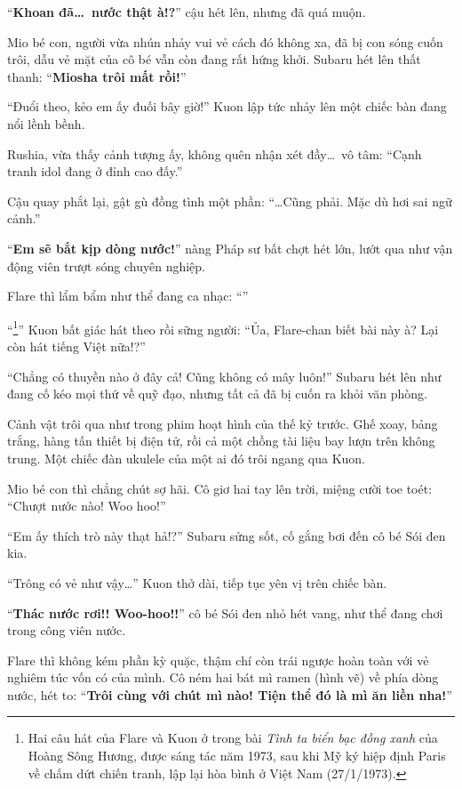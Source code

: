 \documentclass[../main.tex]{subfiles}
\begin{document}

``\textbf{Khoan đã\dots\ nước thật à!?}'' cậu hét lên, nhưng đã quá muộn.

Mio bé con, người vừa nhún nhảy vui vẻ cách đó không xa, đã bị con sóng cuốn trôi, dẫu vẻ mặt của cô bé vẫn còn đang rất hứng khởi. Subaru hét lên thất thanh: ``\textbf{Miosha trôi mất rồi!}''

``Đuổi theo, kẻo em ấy đuối bây giờ!'' Kuon lập tức nhảy lên một chiếc bàn đang nổi lềnh bềnh.

Rushia, vừa thấy cảnh tượng ấy, không quên nhận xét đầy\dots\ vô tâm: ``Cạnh tranh idol đang ở đỉnh cao đấy.''

Cậu quay phắt lại, gật gù đồng tình một phần: ``\dots Cũng phải. Mặc dù hơi sai ngữ cảnh.''

``\textbf{Em sẽ bắt kịp dòng nước!}'' nàng Pháp sư bất chợt hét lớn, lướt qua như vận động viên trượt sóng chuyên nghiệp.

Flare thì lẩm bẩm như thể đang ca nhạc: ``''

``\footnote{Hai câu hát của Flare và Kuon ở trong bài \textit{Tình ta biển bạc đồng xanh} của Hoàng Sông Hương, được sáng tác năm 1973, sau khi Mỹ ký hiệp định Paris về chấm dứt chiến tranh, lập lại hòa bình ở Việt Nam (27/1/1973).}'' Kuon bất giác hát theo rồi sững người: ``Ủa, Flare-chan biết bài này à? Lại còn hát tiếng Việt nữa!?''

``Chẳng có thuyền nào ở đây cả! Cũng không có mây luôn!'' Subaru hét lên như đang cố kéo mọi thứ về quỹ đạo, nhưng tất cả đã bị cuốn ra khỏi văn phòng.

\ct

Cảnh vật trôi qua như trong phim hoạt hình của thế kỷ trước. Ghế xoay, bảng trắng, hàng tấn thiết bị điện tử, rồi cả một chồng tài liệu bay lượn trên không trung. Một chiếc đàn ukulele của một ai đó trôi ngang qua Kuon.

Mio bé con thì chẳng chút sợ hãi. Cô giơ hai tay lên trời, miệng cười toe toét: ``Chượt nước nào! Woo hoo!''

``Em ấy thích trò này thạt hả!?'' Subaru sửng sốt, cố gắng bơi đến cô bé Sói đen kia.

``Trông có vẻ như vậy\dots'' Kuon thở dài, tiếp tục yên vị trên chiếc bàn.

``\textbf{Thác nước rơi!! Woo-hoo!!}'' cô bé Sói đen nhỏ hét vang, như thể đang chơi trong công viên nước.

Flare thì không kém phần kỳ quặc, thậm chí còn trái ngược hoàn toàn với vẻ nghiêm túc vốn có của mình. Cô ném hai bát mì ramen (hình vẽ) về phía dòng nước, hét to: ``\textbf{Trôi cùng với chút mì nào! Tiện thể đó là mì ăn liền nha!}''
\end{document}
